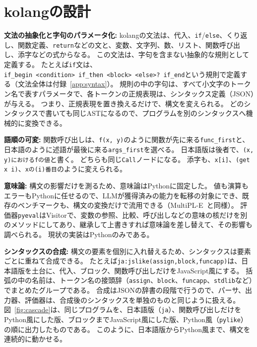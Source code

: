 \documentclass{ipsjprosym}
\begin{document}
\section{kolangの設計}
\label{sec:design}

\textbf{文法の抽象化と字句のパラメータ化:}
kolangの文法は、代入、\verb|if|/\verb|else|、くり返し、関数定義、\verb|return|などの文と、変数、文字列、数、リスト、関数呼び出し、添字などの式からなる。
この文法は、字句を含まない抽象的な規則として定義する。
たとえば\verb|if|文は、\verb|if_begin|\ \verb|<condition>|\ \verb|if_then|\ \verb|<block>|\ \verb|<else>?|\ \verb|if_end|という規則で定義する（文法全体は付録~\ref{app:syntax}）。
規則の中の字句は、すべて小文字のトークン名で表すパラメータで、各トークンの正規表現は、シンタックス定義（JSON）が与える。
つまり、正規表現を置き換えるだけで、構文を変えられる。
どのシンタックスで書いても同じASTになるので、プログラムを別のシンタックスへ機械的に変換できる。

\textbf{語順の可変:}
関数呼び出しは、\verb|f(x, y)|のように関数が先に来る\verb|func_first|と、日本語のように述語が最後に来る\verb|args_first|を選べる。
日本語版は後者で、\verb|(x, y)におけるfの値|と書く。
どちらも同じ\verb|Call|ノードになる。
添字も、\verb|x[i]|、\verb|(get x i)|、\verb|xの(i)番目|のように変えられる。

\textbf{意味論:}
構文の影響だけを測るため、意味論はPythonに固定した。
値も演算もエラーもPythonに任せるので、LLMが獲得済みの能力を転移の対象にでき、既存のベンチマークも、構文の変換だけで流用できる（MultiPL-E~\cite{Cassano2023MultiPLE}と同様）。
評価器\verb|pyeval|はVisitorで、変数の参照、比較、呼び出しなどの意味の核だけを別のメソッドにしてあり、継承して上書きすれば意味論を差し替えて、その影響も調べられる。
現状の実装はPythonのみである。

\textbf{シンタックスの合成:}
構文の要素を個別に入れ替えるため、シンタックスは要素ごとに重ねて合成できる。
たとえば\verb|ja:jslike(assign,block,funcapp)|は、日本語版を土台に、代入、ブロック、関数呼び出しだけをJavaScript風にする。
括弧の中の名前は、トークン名の接頭辞（\verb|assign|、\verb|block|、\verb|funcapp|、\verb|stdlib|など）でまとめたグループである。
合成はJSONの辞書の段階で行うので、パーサ、出力器、評価器は、合成後のシンタックスを単独のものと同じように扱える。
図~\ref{fig:cascade}は、同じプログラムを、日本語版（\verb|ja|）、関数呼び出しだけをPython風にした版、ブロックまでJavaScript風にした版、Python風（\verb|pylike|）の順に出力したものである。
このように、日本語版からPython風まで、構文を連続的に動かせる。
\end{document}
